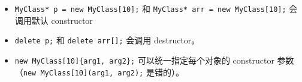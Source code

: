 
\begin{itemize}

\item \verb`MyClass* p = new MyClass[10];` 和 \verb`MyClass* arr = new MyClass[10];` 会调用默认 constructor
\item \verb`delete p;` 和 \verb`delete arr[];` 会调用 destructor。
\item \verb`new MyClass[10]{arg1, arg2};` 可以统一指定每个对象的 constructor 参数（\verb`new MyClass[10](arg1, arg2);` 是错的）。
\end{itemize}
